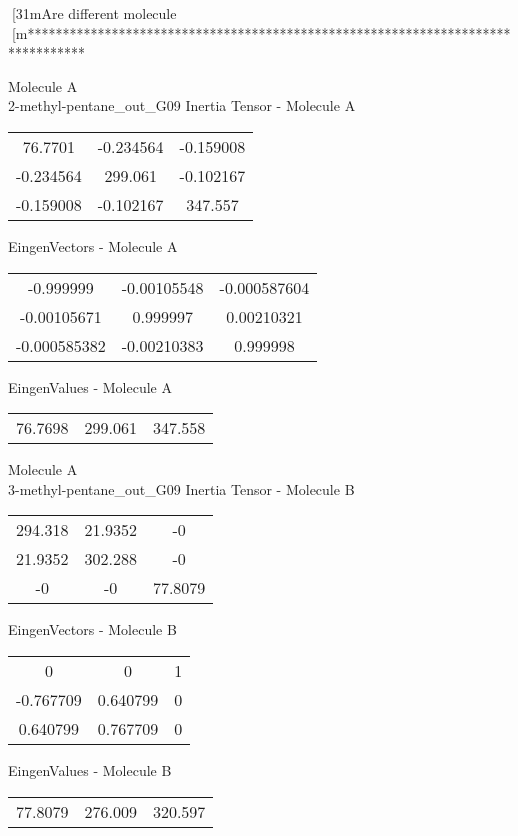 [31mAre different molecule
[m********************************************************************************
\newpage
\begin{multicols}{2}
\begin{center}
Molecule A \\ 
2-methyl-pentane_out_G09
Inertia Tensor - Molecule A \\
\vtab
\begin{tabular}{|c c c|}
76.7701	 & 	-0.234564	 & 	-0.159008	 \\
-0.234564	 & 	299.061	 & 	-0.102167	 \\
-0.159008	 & 	-0.102167	 & 	347.557
\end{tabular}

\vtab
 EingenVectors - Molecule A     \\
\vtab
\begin{tabular}{|c c c|}
-0.999999	 & 	-0.00105548	 & 	-0.000587604	 \\
-0.00105671	 & 	0.999997	 & 	0.00210321	 \\
-0.000585382	 & 	-0.00210383	 & 	0.999998
\end{tabular}

\vtab
 EingenValues - Molecule A     \\
\vtab
\begin{tabular}{|c c c|}
76.7698	 & 	299.061	 & 	347.558
\end{tabular}
\columnbreak
Molecule A \\ 
3-methyl-pentane_out_G09
Inertia Tensor - Molecule B \\
\vtab
\begin{tabular}{|c c c|}
294.318	 & 	21.9352	 & 	-0	 \\
21.9352	 & 	302.288	 & 	-0	 \\
-0	 & 	-0	 & 	77.8079
\end{tabular}

\vtab
 EingenVectors - Molecule B     \\
\vtab
\begin{tabular}{|c c c|}
0	 & 	0	 & 	1	 \\
-0.767709	 & 	0.640799	 & 	0	 \\
0.640799	 & 	0.767709	 & 	0
\end{tabular}

\vtab
 EingenValues - Molecule B     \\
\vtab
\begin{tabular}{|c c c|}
77.8079	 & 	276.009	 & 	320.597
\end{tabular}
\end{center}
\end{multicols}
